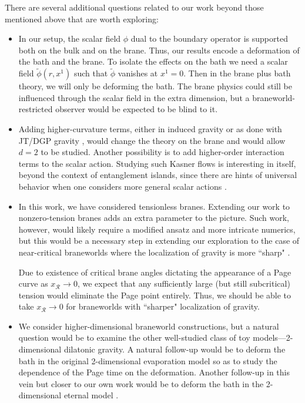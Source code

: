 \documentclass[12pt,a4paper]{article}
\begin{document}
There are several additional questions related to our work beyond those mentioned above that are worth exploring:
\begin{itemize}

\item In our setup, the scalar field $\phi$ dual to the boundary operator is supported both on the bulk and on the brane. Thus, our results encode a deformation of the bath and the brane. To isolate the effects on the bath we need a scalar field $\tilde{\phi}(r,x^1)$ such that $\tilde{\phi}$ vanishes at $x^1 = 0$. Then in the brane plus bath theory, we will only be deforming the bath. The brane physics could still be influenced through the scalar field in the extra dimension, but a braneworld-restricted observer would be expected to be blind to it. 

\item Adding higher-curvature terms, either in induced gravity or as done with JT/DGP gravity \cite{Chen:2020uac}, would change the theory on the brane and would allow $d = 2$ to be studied. Another possibility is to add higher-order interaction terms to the scalar action. Studying such Kasner flows is interesting in itself, beyond the context of entanglement islands, since there are hints of universal behavior when one considers more general scalar actions \cite{Wang:2020nkd}.

\item In this work, we have considered tensionless branes. Extending our work to nonzero-tension branes adds an extra parameter to the picture. Such work, however, would likely require a modified ansatz and more intricate numerics, but this would be a necessary step in extending our exploration to the case of near-critical braneworlds where the localization of gravity is more ``sharp" \cite{Karch:2000ct}.

Due to existence of critical brane angles \cite{Chen:2020hmv,Geng:2020fxl,Uhlemann:2021nhu,Geng:2021eps} dictating the appearance of a Page curve as $x_\mathcal{R} \to 0$, we expect that any sufficiently large (but still subcritical) tension would eliminate the Page point entirely. Thus, we should be able to take $x_\mathcal{R} \to 0$ for braneworlds with ``sharper" localization of gravity.

\item We consider higher-dimensional braneworld constructions, but a natural question would be to examine the other well-studied class of toy models---2-dimensional dilatonic gravity. A natural follow-up would be to deform the bath in the original 2-dimensional evaporation model \cite{Almheiri:2019psf} so as to study the dependence of the Page time on the deformation. Another follow-up in this vein but closer to our own work would be to deform the bath in the 2-dimensional eternal model \cite{Almheiri:2019yqk}.


\end{itemize}
\end{document}
